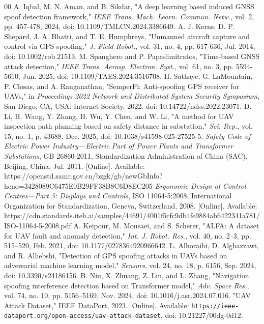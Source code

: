 \documentclass{ieeeaccess}
\begin{document}
\begin{thebibliography}{00}
 A. Iqbal, M. N. Aman, and B. Sikdar, "A deep learning based induced GNSS spoof detection framework," \textit{IEEE Trans. Mach. Learn. Commun. Netw.}, vol. 2, pp. 457-478, 2024, doi: 10.1109/TMLCN.2024.3386649.
 A. J. Kerns, D. P. Shepard, J. A. Bhatti, and T. E. Humphreys, "Unmanned aircraft capture and control via GPS spoofing," \textit{J. Field Robot.}, vol. 31, no. 4, pp. 617-636, Jul. 2014, doi: 10.1002/rob.21513.
 M. Spanghero and P. Papadimitratos, "Time-based GNSS attack detection," \textit{IEEE Trans. Aerosp. Electron. Syst.}, vol. 61, no. 3, pp. 5594-5610, Jun. 2025, doi: 10.1109/TAES.2024.3516708.
 H. Sathaye, G. LaMountain, P. Closas, and A. Ranganathan, "SemperFi: Anti-spoofing GPS receiver for UAVs," in \textit{Proceedings 2022 Network and Distributed System Security Symposium}, San Diego, CA, USA: Internet Society, 2022. doi: 10.14722/ndss.2022.23071.
 D. Li, H. Wang, Y. Zhang, H. Wu, Y. Chen, and W. Li, "A method for UAV inspection path planning based on safety distance in substation," \textit{Sci. Rep.}, vol. 15, no. 1, p. 43688, Dec. 2025, doi: 10.1038/s41598-025-27525-5.
 \textit{Safety Code of Electric Power Industry---Electric Part of Power Plants and Transformer Substations}, GB 26860-2011, Standardization Administration of China (SAC), Beijing, China, Jul. 2011. [Online]. Available: https://openstd.samr.gov.cn/bzgk/gb/newGbInfo?hcno=3428089C6475E0B29FF38B8C6D8EC205
 \textit{Ergonomic Design of Control Centres---Part 5: Displays and Controls}, ISO 11064-5:2008, International Organization for Standardization, Geneva, Switzerland, 2008. [Online]. Available: https://cdn.standards.iteh.ai/samples/44691/4001f5cfc9db4fe9884ab6422341a781/ISO-11064-5-2008.pdf
 A. Keipour, M. Mousaei, and S. Scherer, "ALFA: A dataset for UAV fault and anomaly detection," \textit{Int. J. Robot. Res.}, vol. 40, no. 2--3, pp. 515--520, Feb. 2021, doi: 10.1177/0278364920966642.
 L. Alhoraibi, D. Alghazzawi, and R. Alhebshi, "Detection of GPS spoofing attacks in UAVs based on adversarial machine learning model," \textit{Sensors}, vol. 24, no. 18, p. 6156, Sep. 2024, doi: 10.3390/s24186156.
 B. Niu, X. Zhuang, Z. Lin, and L. Zhang, "Navigation spoofing interference detection based on Transformer model," \textit{Adv. Space Res.}, vol. 74, no. 10, pp. 5156--5169, Nov. 2024, doi: 10.1016/j.asr.2024.07.016.
 "UAV Attack Dataset," IEEE DataPort, 2023. [Online]. Available: \texttt{https://ieee-dataport.org/open-access/uav-attack-dataset}, doi: 10.21227/00dg-0d12.

\end{thebibliography}
\end{document}
